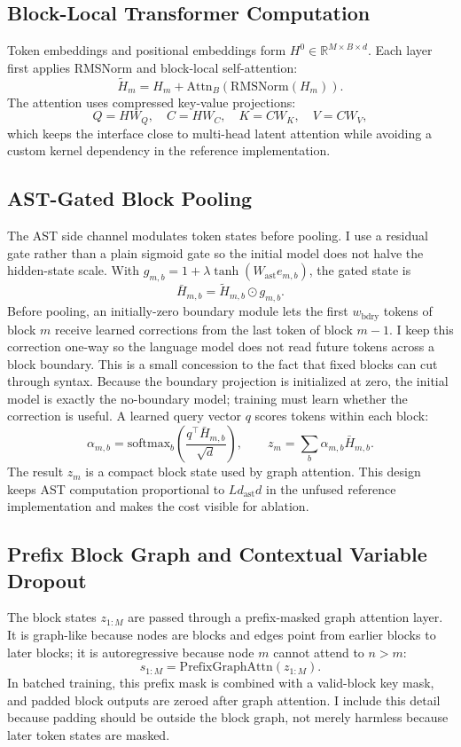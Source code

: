 \documentclass[10pt]{article}
\begin{document}
\subsection{Block-Local Transformer Computation}

Token embeddings and positional embeddings form $H^0\in\mathbb{R}^{M\times B
\times d}$.  Each layer first applies RMSNorm and block-local self-attention:
\[
  \tilde H_m = H_m + \mathrm{Attn}_B(\mathrm{RMSNorm}(H_m)).
\]
The attention uses compressed key-value projections:
\[
  Q = HW_Q,\quad C=HW_C,\quad K=CW_K,\quad V=CW_V,
\]
which keeps the interface close to multi-head latent attention while avoiding a
custom kernel dependency in the reference implementation.

\subsection{AST-Gated Block Pooling}

The AST side channel modulates token states before pooling.  I use a residual
gate rather than a plain sigmoid gate so the initial model does not halve the
hidden-state scale.  With
$g_{m,b}=1+\lambda\tanh(W_{\mathrm{ast}} e_{m,b})$, the gated state is
\[
  \bar H_{m,b}=\tilde H_{m,b}\odot g_{m,b}.
\]
Before pooling, an initially-zero boundary module lets the first
$w_{\mathrm{bdry}}$ tokens of block $m$ receive learned corrections from the
last token of block $m-1$.  I keep this correction one-way so the language model
does not read future tokens across a block boundary.  This is a small concession
to the fact that fixed blocks can cut through syntax.  Because the boundary
projection is initialized at zero, the initial model is exactly the no-boundary
model; training must learn whether the correction is useful.
A learned query vector $q$ scores tokens within each block:
\[
  \alpha_{m,b} =
  \mathrm{softmax}_b\left(\frac{q^\top \bar H_{m,b}}{\sqrt d}\right),\qquad
  z_m=\sum_b \alpha_{m,b}\bar H_{m,b}.
\]
The result $z_m$ is a compact block state used by graph attention.  This design
keeps AST computation proportional to $L d_{\mathrm{ast}} d$ in the unfused
reference implementation and makes the cost visible for ablation.

\subsection{Prefix Block Graph and Contextual Variable Dropout}

The block states $z_{1:M}$ are passed through a prefix-masked graph attention
layer.  It is graph-like because nodes are blocks and edges point from earlier
blocks to later blocks; it is autoregressive because node $m$ cannot attend to
$n>m$:
\[
  s_{1:M}=\mathrm{PrefixGraphAttn}(z_{1:M}).
\]
In batched training, this prefix mask is combined with a valid-block key mask,
and padded block outputs are zeroed after graph attention.  I include this
detail because padding should be outside the block graph, not merely harmless
because later token states are masked.
\end{document}
